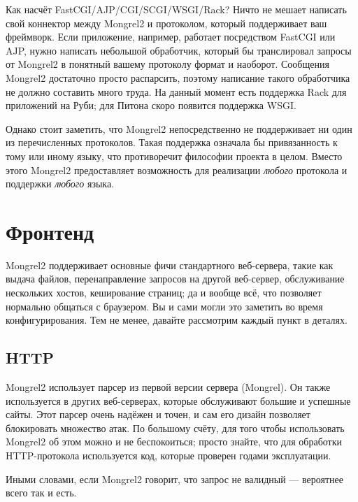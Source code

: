 \begin{aside}{Как насчёт FastCGI/AJP/CGI/SCGI/WSGI/Rack?}
Ничто не мешает написать свой коннектор между Mongrel2 и протоколом, который
поддерживает ваш фреймворк. Если приложение, например, работает посредством
FastCGI или AJP, нужно написать небольшой обработчик, который бы транслировал
запросы от Mongrel2 в понятный вашему протоколу формат и наоборот. Сообщения
Mongrel2 достаточно просто распарсить, поэтому написание такого обработчика не
должно составить много труда. На данный момент есть поддержка Rack для
приложений на Руби; для Питона скоро появится поддержка WSGI.

Однако стоит заметить, что Mongrel2 непосредственно не поддерживает ни один из
перечисленных протоколов. Такая поддержка означала бы привязанность к тому или
иному языку, что противоречит философии проекта в целом. Вместо этого Mongrel2
предоставляет возможность для реализации \emph{любого} протокола и поддержки
\emph{любого} языка.
\end{aside}


\section{Фронтенд}

Mongrel2 поддерживает основные фичи стандартного веб-сервера, такие как выдача
файлов, перенаправление запросов на другой веб-сервер, обслуживание нескольких
хостов, кеширование страниц; да и вообще всё, что позволяет нормально общаться
с браузером. Вы и сами могли это заметить во время конфигурирования. Тем не
менее, давайте рассмотрим каждый пункт в деталях.

\subsection{HTTP}

Mongrel2 использует парсер из первой версии сервера (Mongrel). Он также
используется в других веб-серверах, которые обслуживают большие и успешные
сайты. Этот парсер очень надёжен и точен, и сам его дизайн позволяет
блокировать множество атак. По большому счёту, для того чтобы использовать
Mongrel2 об этом можно и не беспокоиться; просто знайте, что для обработки
HTTP-протокола используется код, которые проверен годами эксплуатации.

Иными словами, если Mongrel2 говорит, что запрос не валидный --- вероятнее всего
так и есть.

